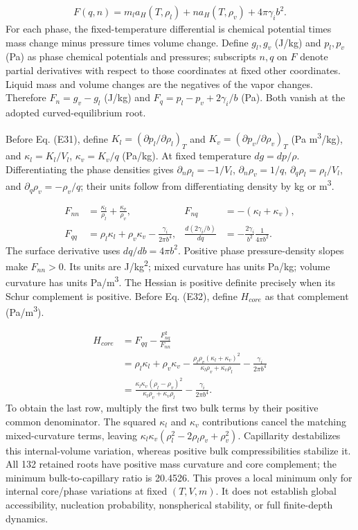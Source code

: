 \documentclass[10pt,a4paper]{article}
\begin{document}
{\small\begin{align*}
F(q,n)=m_l a_H(T,\rho_l)+n a_H(T,\rho_v)+4\pi\gamma_i b^2. \tag{E30}
\end{align*}}
For each phase, the fixed-temperature differential is chemical potential times mass change minus pressure times volume change. Define $g_l,g_v$ (J/kg) and $p_l,p_v$ (Pa) as phase chemical potentials and pressures; subscripts $n,q$ on $F$ denote partial derivatives with respect to those coordinates at fixed other coordinates. Liquid mass and volume changes are the negatives of the vapor changes. Therefore $F_n=g_v-g_l$ (J/kg) and $F_q=p_l-p_v+2\gamma_i/b$ (Pa). Both vanish at the adopted curved-equilibrium root.

Before Eq. (E31), define $K_l=(\partial p_l/\partial\rho_l)_T$ and $K_v=(\partial p_v/\partial\rho_v)_T$ (Pa m\textsuperscript{3}/kg), and $\kappa_l=K_l/V_l$, $\kappa_v=K_v/q$ (Pa/kg). At fixed temperature $dg=dp/\rho$. Differentiating the phase densities gives $\partial_n\rho_l=-1/V_l$, $\partial_n\rho_v=1/q$, $\partial_q\rho_l=\rho_l/V_l$, and $\partial_q\rho_v=-\rho_v/q$; their units follow from differentiating density by kg or m\textsuperscript{3}.

{\small\begin{align*}
F_{nn}&=\frac{\kappa_l}{\rho_l}+\frac{\kappa_v}{\rho_v},
&F_{nq}&=-(\kappa_l+\kappa_v),\\
F_{qq}&=\rho_l\kappa_l+\rho_v\kappa_v-\frac{\gamma_i}{2\pi b^4},
&\frac{d(2\gamma_i/b)}{dq}&=-\frac{2\gamma_i}{b^2}\frac{1}{4\pi b^2}.
\tag{E31}
\end{align*}}
The surface derivative uses $dq/db=4\pi b^2$. Positive phase pressure-density slopes make $F_{nn}>0$. Its units are J/kg\textsuperscript{2}; mixed curvature has units Pa/kg; volume curvature has units Pa/m\textsuperscript{3}. The Hessian is positive definite precisely when its Schur complement is positive. Before Eq. (E32), define $H_{core}$ as that complement (Pa/m\textsuperscript{3}).

{\small\begin{align*}
H_{core}&=F_{qq}-\frac{F_{nq}^2}{F_{nn}}\\
&=\rho_l\kappa_l+\rho_v\kappa_v
-\frac{\rho_l\rho_v(\kappa_l+\kappa_v)^2}{\kappa_l\rho_v+\kappa_v\rho_l}
-\frac{\gamma_i}{2\pi b^4}\\
&=\frac{\kappa_l\kappa_v(\rho_l-\rho_v)^2}
{\kappa_l\rho_v+\kappa_v\rho_l}-\frac{\gamma_i}{2\pi b^4}. \tag{E32}
\end{align*}}
To obtain the last row, multiply the first two bulk terms by their positive common denominator. The squared $\kappa_l$ and $\kappa_v$ contributions cancel the matching mixed-curvature terms, leaving $\kappa_l\kappa_v(\rho_l^2-2\rho_l\rho_v+\rho_v^2)$. Capillarity destabilizes this internal-volume variation, whereas positive bulk compressibilities stabilize it. All 132 retained roots have positive mass curvature and core complement; the minimum bulk-to-capillary ratio is 20.4526. This proves a local minimum only for internal core/phase variations at fixed $(T,V,m)$. It does not establish global accessibility, nucleation probability, nonspherical stability, or full finite-depth dynamics.
\end{document}
